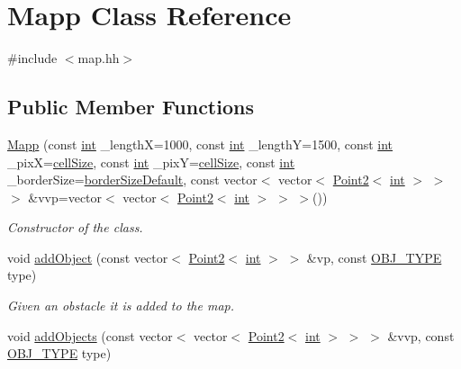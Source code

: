 \hypertarget{class_mapp}{}\section{Mapp Class Reference}
\label{class_mapp}


{\ttfamily \#include $<$map.\+hh$>$}

\subsection*{Public Member Functions}
\begin{DoxyCompactItemize}
\item 
\mbox{\hyperlink{class_mapp_a748ffcb20519591210f19458c90f482a}{Mapp}} (const \mbox{\hyperlink{draw_8hh_aa620a13339ac3a1177c86edc549fda9b}{int}} \+\_\+lengthX=1000, const \mbox{\hyperlink{draw_8hh_aa620a13339ac3a1177c86edc549fda9b}{int}} \+\_\+lengthY=1500, const \mbox{\hyperlink{draw_8hh_aa620a13339ac3a1177c86edc549fda9b}{int}} \+\_\+pixX=\mbox{\hyperlink{class_mapp_a8216044ff8e95ba054985e26ae1c75f8}{cell\+Size}}, const \mbox{\hyperlink{draw_8hh_aa620a13339ac3a1177c86edc549fda9b}{int}} \+\_\+pixY=\mbox{\hyperlink{class_mapp_a8216044ff8e95ba054985e26ae1c75f8}{cell\+Size}}, const \mbox{\hyperlink{draw_8hh_aa620a13339ac3a1177c86edc549fda9b}{int}} \+\_\+border\+Size=\mbox{\hyperlink{class_mapp_aef8bde83114714a4ce4ad9d13766e761}{border\+Size\+Default}}, const vector$<$ vector$<$ \mbox{\hyperlink{class_point2}{Point2}}$<$ \mbox{\hyperlink{draw_8hh_aa620a13339ac3a1177c86edc549fda9b}{int}} $>$ $>$ $>$ \&vvp=vector$<$ vector$<$ \mbox{\hyperlink{class_point2}{Point2}}$<$ \mbox{\hyperlink{draw_8hh_aa620a13339ac3a1177c86edc549fda9b}{int}} $>$ $>$ $>$())
\begin{DoxyCompactList}\small\item\em Constructor of the class. \end{DoxyCompactList}\item 
void \mbox{\hyperlink{class_mapp_ad480beefb37fe0e3cab870fea0a4a1f7}{add\+Object}} (const vector$<$ \mbox{\hyperlink{class_point2}{Point2}}$<$ \mbox{\hyperlink{draw_8hh_aa620a13339ac3a1177c86edc549fda9b}{int}} $>$ $>$ \&vp, const \mbox{\hyperlink{map_8hh_a714b9c2c276fbae637fee36453d9121e}{O\+B\+J\+\_\+\+T\+Y\+PE}} type)
\begin{DoxyCompactList}\small\item\em Given an obstacle it is added to the map. \end{DoxyCompactList}\item 
void \mbox{\hyperlink{class_mapp_ab235ba9946b7c5e44a4914ca26f6d5fc}{add\+Objects}} (const vector$<$ vector$<$ \mbox{\hyperlink{class_point2}{Point2}}$<$ \mbox{\hyperlink{draw_8hh_aa620a13339ac3a1177c86edc549fda9b}{int}} $>$ $>$ $>$ \&vvp, const \mbox{\hyperlink{map_8hh_a714b9c2c276fbae637fee36453d9121e}{O\+B\+J\+\_\+\+T\+Y\+PE}} type)

\end{DoxyCompactItemize}

